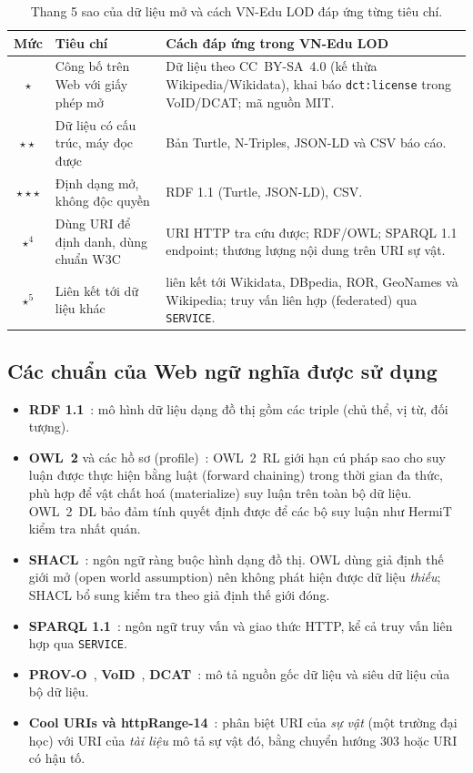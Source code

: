\documentclass[12pt,a4paper]{article}
\newcommand{\proj}{VN-Edu LOD}
\begin{document}
\begin{table}[htbp]
\centering\small
\caption{Thang 5 sao của dữ liệu mở và cách \proj{} đáp ứng từng tiêu chí.}\label{tab:5star}
\begin{tabularx}{\textwidth}{c>{\raggedright\arraybackslash}p{4.2cm}X}
\toprule
Mức & Tiêu chí & Cách đáp ứng trong \proj{} \\
\midrule
\(\star\) & Công bố trên Web với giấy phép mở & Dữ liệu theo CC~BY-SA~4.0 (kế thừa Wikipedia/Wikidata), khai báo
\texttt{dct:license} trong VoID/DCAT; mã nguồn MIT. \\
\(\star\star\) & Dữ liệu có cấu trúc, máy đọc được & Bản Turtle, N-Triples, JSON-LD và CSV báo cáo. \\
\(\star\star\star\) & Định dạng mở, không độc quyền & RDF 1.1 (Turtle, JSON-LD), CSV. \\
\(\star^4\) & Dùng URI để định danh, dùng chuẩn W3C & \metricLocalResources{} URI HTTP tra cứu được; RDF/OWL; SPARQL
1.1 endpoint; thương lượng nội dung trên URI sự vật. \\
\(\star^5\) & Liên kết tới dữ liệu khác & \metricLinkTriples{} liên kết tới Wikidata, DBpedia, ROR, GeoNames và Wikipedia;
truy vấn liên hợp (federated) qua \texttt{SERVICE}. \\
\bottomrule
\end{tabularx}
\end{table}

\subsection{Các chuẩn của Web ngữ nghĩa được sử dụng}
\begin{itemize}
  \item \textbf{RDF 1.1}~\cite{w3c2014rdf}: mô hình dữ liệu dạng đồ thị gồm các triple (chủ thể, vị từ, đối tượng).
  \item \textbf{OWL~2} và các hồ sơ (profile)~\cite{w3c2012owlprofiles}: OWL~2~RL giới hạn cú pháp sao cho suy luận
  được thực hiện bằng luật (forward chaining) trong thời gian đa thức, phù hợp để vật chất hoá (materialize) suy luận
  trên toàn bộ dữ liệu. OWL~2~DL bảo đảm tính quyết định được để các bộ suy luận như HermiT~\cite{glimm2014hermit}
  kiểm tra nhất quán.
  \item \textbf{SHACL}~\cite{w3c2017shacl}: ngôn ngữ ràng buộc hình dạng đồ thị. OWL dùng giả định thế giới mở (open
  world assumption) nên không phát hiện được dữ liệu \emph{thiếu}; SHACL bổ sung kiểm tra theo giả định thế giới đóng.
  \item \textbf{SPARQL 1.1}~\cite{w3c2013sparql,w3c2013sparqlfed}: ngôn ngữ truy vấn và giao thức HTTP, kể cả truy vấn
  liên hợp qua \texttt{SERVICE}.
  \item \textbf{PROV-O}~\cite{w3c2013provo}, \textbf{VoID}~\cite{w3c2011void}, \textbf{DCAT}~\cite{w3c2020dcat}: mô tả
  nguồn gốc dữ liệu và siêu dữ liệu của bộ dữ liệu.
  \item \textbf{Cool URIs và httpRange-14}~\cite{w3c2008cooluris,w3c2005httprange14}: phân biệt URI của \emph{sự vật}
  (một trường đại học) với URI của \emph{tài liệu} mô tả sự vật đó, bằng chuyển hướng 303 hoặc URI có hậu tố.
\end{itemize}
\end{document}
